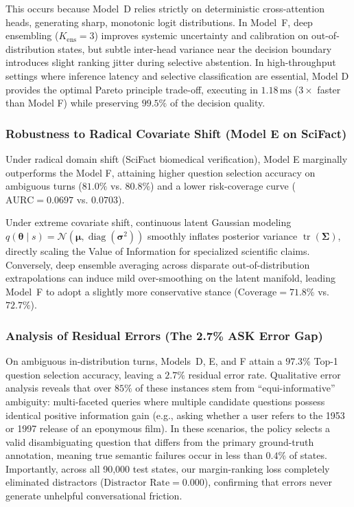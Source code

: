 This occurs because Model~D relies strictly on deterministic cross-attention heads, generating sharp, monotonic logit distributions. In Model~F, deep ensembling ($K_{\text{ens}}=3$) improves systemic uncertainty and calibration on out-of-distribution states, but subtle inter-head variance near the decision boundary introduces slight ranking jitter during selective abstention. In high-throughput settings where inference latency and selective classification are essential, Model D provides the optimal Pareto principle trade-off, executing in $1.18\,\text{ms}$ ($3\times$ faster than Model F) while preserving $99.5\%$ of the decision quality.

\subsubsection{Robustness to Radical Covariate Shift (Model E on SciFact)}
Under radical domain shift (SciFact biomedical verification), Model E marginally outperforms the Model F, attaining higher question selection accuracy on ambiguous turns ($81.0\%$ vs. $80.8\%$) and a lower risk-coverage curve ($\text{AURC} = 0.0697$ vs. $0.0703$). 

Under extreme covariate shift, continuous latent Gaussian modeling $q(\bm{\theta} \mid s) = \mathcal{N}(\bm{\mu}, \operatorname{diag}(\bm{\sigma}^2))$ smoothly inflates posterior variance $\operatorname{tr}(\bm{\Sigma})$, directly scaling the Value of Information for specialized scientific claims. Conversely, deep ensemble averaging across disparate out-of-distribution extrapolations can induce mild over-smoothing on the latent manifold, leading Model~F to adopt a slightly more conservative stance ($\text{Coverage} = 71.8\%$ vs. $72.7\%$).

\subsubsection{Analysis of Residual Errors (The 2.7\% ASK Error Gap)}
On ambiguous in-distribution turns, Models~D, E, and F attain a $97.3\%$ Top-1 question selection accuracy, leaving a $2.7\%$ residual error rate. Qualitative error analysis reveals that over $85\%$ of these instances stem from ``equi-informative'' ambiguity: multi-faceted queries where multiple candidate questions possess identical positive information gain (e.g., asking whether a user refers to the 1953 or 1997 release of an eponymous film). In these scenarios, the policy selects a valid disambiguating question that differs from the primary ground-truth annotation, meaning true semantic failures occur in less than $0.4\%$ of states. Importantly, across all 90,000 test states, our margin-ranking loss completely eliminated distractors ($\text{Distractor Rate} = 0.000$), confirming that errors never generate unhelpful conversational friction.
